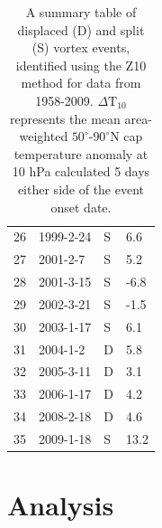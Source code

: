 \begin{table}
\begin{centering}
\begin{tabular}{|l|l|l|l|}
    26  & 1999-2-24   & S          & 6.6         \\
    27  & 2001-2-7    & S          & 5.2         \\
    28  & 2001-3-15   & S          & -6.8        \\
    29  & 2002-3-21   & S          & -1.5        \\
    30  & 2003-1-17   & S          & 6.1         \\
    31  & 2004-1-2    & D          & 5.8         \\
    32  & 2005-3-11   & D          & 3.1         \\
    33  & 2006-1-17   & D          & 4.2         \\
    34  & 2008-2-18   & D          & 4.6         \\
    35  & 2009-1-18   & S          & 13.2        \\ \hline
    \end{tabular}
    \caption{A summary table of displaced (D) and split (S) vortex events,
      identified using the Z10 method for data from 1958-2009.
      $\Delta \mathrm{T}_{10}$ represents the mean area-weighted
      $50^{\circ}$-$90^{\circ}$N cap temperature anomaly at 10 hPa calculated 5
      days either side of the event onset date.}
\end{centering}
\label{tab:events}
\end{table}

\section{Analysis}

